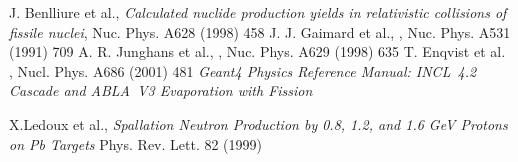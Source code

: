 \documentclass[a4paper]{jpconf}
\begin{document}
\begin{thebibliography}{9}

 J. Benlliure et al., \emph{Calculated nuclide
    production yields in relativistic collisions of fissile nuclei},
  Nuc. Phys. A628 (1998) 458
 J. J. Gaimard et al., \emph{},
  Nuc. Phys. A531 (1991) 709
 A. R. Junghans et al., \emph{},
  Nuc. Phys. A629 (1998) 635
 T. Enqvist et al. \emph{},
  Nucl. Phys. A686 (2001) 481
 \emph{Geant4 Physics Reference Manual: INCL~4.2 Cascade and ABLA~V3 Evaporation with Fission} 

 X.Ledoux et al., \emph{Spallation Neutron Production by
  0.8, 1.2, and 1.6 GeV Protons on Pb Targets} Phys. Rev. Lett. 82
  (1999)

\end{thebibliography}
\end{document}
